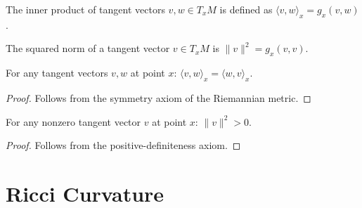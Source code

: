 \begin{definition}
\label{def:inner_product}
\leanok
{}
The inner product of tangent vectors $v, w \in T_xM$ is defined as $\langle v, w \rangle_x = g_x(v, w)$.
\end{definition}

\begin{definition}
\label{def:norm_sq}
\leanok
{}
The squared norm of a tangent vector $v \in T_xM$ is $\|v\|^2 = g_x(v, v)$.
\end{definition}

\begin{lemma}
\label{lem:inner_product_symm}
\leanok
{}
For any tangent vectors $v, w$ at point $x$: $\langle v, w \rangle_x = \langle w, v \rangle_x$.
\end{lemma}

\begin{proof}
\leanok
{}
Follows from the symmetry axiom of the Riemannian metric.
\end{proof}

\begin{lemma}
\label{lem:norm_sq_pos}
\leanok
{}
For any nonzero tangent vector $v$ at point $x$: $\|v\|^2 > 0$.
\end{lemma}

\begin{proof}
\leanok
{}
Follows from the positive-definiteness axiom.
\end{proof}

\chapter{Ricci Curvature}
\label{chap:ricci}

